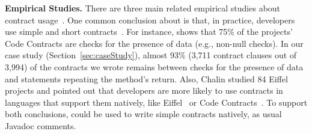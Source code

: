 \textbf{Empirical Studies.}
There are three main related empirical studies about contract usage~\cite{typeContracts,Estler-etal14,Chalin06}.
One common conclusion about is that, in practice, developers use simple and short contracts~\cite{typeContracts,Estler-etal14}. For instance, \cite{typeContracts} shows that 75\% of the projects' Code Contracts are checks for the presence of data (e.g., non-null checks).
In our case study (Section~\ref{sec:caseStudy}), almost 93\% (3,711 contract clauses out of 3,994) of the contracts we wrote remains between checks for the presence of data and statements repeating the method's return. 
Also, Chalin studied 84 Eiffel~\cite{eiffel} projects and pointed out that developers are more likely to use contracts in languages that support them natively, like Eiffel~\cite{eiffel} or Code Contracts~\cite{codeContractsPaper}. To support both conclusions, \contractjdoc{}could be used to write simple contracts natively, as usual Javadoc comments.
